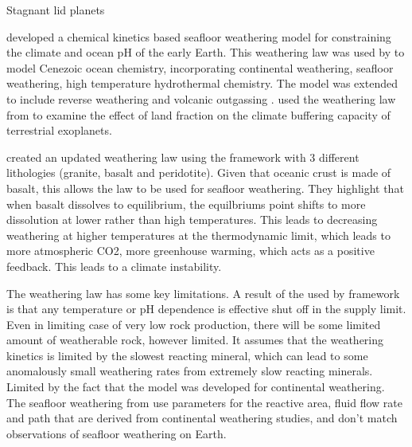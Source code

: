 \documentclass[fleqn,usenatbib]{mnras}
\begin{document}
Stagnant lid planets
\cite{honing_carbon_2019}

\cite{krissansen-totton_constraining_2017, krissansen-totton_constraining_2018} developed a chemical kinetics based seafloor weathering model for constraining the climate and ocean pH of the early Earth. This weathering law was used by \cite{coogan_controls_2022} to model Cenezoic ocean chemistry, incorporating continental weathering, seafloor weathering, high temperature hydrothermal chemistry. The model was extended to include reverse weathering and volcanic outgassing \citep{coogan_model_2026}. \cite{hayworth_waterworlds_2020} used the weathering law from \cite{krissansen-totton_constraining_2017} to examine the effect of land fraction on the climate buffering capacity of terrestrial exoplanets. 

\cite{hakim_lithologic_2021} created an updated weathering law using the \cite{maher_hydrologic_2014} framework with 3 different lithologies (granite, basalt and peridotite). Given that oceanic crust is made of basalt, this allows the law to be used for seafloor weathering. They highlight that when basalt dissolves to equilibrium, the equilbriums point shifts to more dissolution at lower rather than high temperatures. This leads to decreasing weathering at higher temperatures at the thermodynamic limit, which leads to more atmospheric CO2, more greenhouse warming, which acts as a positive feedback. This leads to a climate instability. 

The \cite{hakim_lithologic_2021} weathering law has some key limitations. A result of the \cite{maher_hydrologic_2014} used by \cite{hakim_lithologic_2021} framework is that any temperature or pH dependence is effective shut off in the supply limit. Even in limiting case of very low rock production, there will be some limited amount of weatherable rock, however limited. It assumes that the weathering kinetics is limited by the slowest reacting mineral, which can lead to some anomalously small weathering rates from extremely slow reacting minerals. 
Limited by the fact that the model was developed for continental weathering. The seafloor weathering from \cite{hakim_lithologic_2021} use parameters for the reactive area, fluid flow rate and path that are derived from continental weathering studies, and don't match observations of seafloor weathering on Earth.
\end{document}

